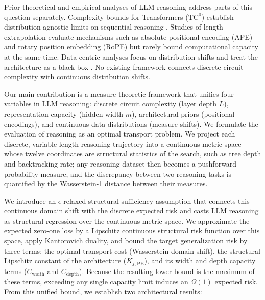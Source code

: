 \documentclass{article}
\begin{document}
Prior theoretical and empirical analyses of LLM reasoning address parts of this question separately. Complexity bounds for Transformers ($\text{TC}^0$) establish distribution-agnostic limits on sequential reasoning \citep{Hahn_2020, merrill2023parallelismtradeofflimitationslogprecision, feng2023revealingmysterychainthought}. Studies of length extrapolation evaluate mechanisms such as absolute positional encoding (APE) and rotary position embedding (RoPE) \citep{kazemnejad2023impactpositionalencodinglength, ruoss2023randomizedpositionalencodingsboost} but rarely bound computational capacity at the same time. Data-centric analyses focus on distribution shifts and treat the architecture as a black box \citep{zhao2026chainofthoughtreasoningllmsmirage, prystawski2023thinkstepstepreasoning}. No existing framework connects discrete circuit complexity with continuous distribution shifts.

Our main contribution is a measure-theoretic framework that unifies four variables in LLM reasoning: discrete circuit complexity (layer depth $L$), representation capacity (hidden width $m$), architectural priors (positional encodings), and continuous data distributions (measure shifts). We formulate the evaluation of reasoning as an optimal transport problem. We project each discrete, variable-length reasoning trajectory into a continuous metric space whose twelve coordinates are structural statistics of the search, such as tree depth and backtracking rate; any reasoning dataset then becomes a pushforward probability measure, and the discrepancy between two reasoning tasks is quantified by the Wasserstein-1 distance between their measures. 

We introduce an $\epsilon$-relaxed structural sufficiency assumption that connects this continuous domain shift with the discrete expected risk and casts LLM reasoning as structural regression over the continuous metric space. We approximate the expected zero-one loss by a Lipschitz continuous structural risk function over this space, apply Kantorovich duality, and bound the target generalization risk by three terms: the optimal transport cost (Wasserstein domain shift), the structural Lipschitz constant of the architecture ($K_{f,\mathrm{PE}}$), and its width and depth capacity terms ($C_{\mathrm{width}}$ and $C_{\mathrm{depth}}$). Because the resulting lower bound is the maximum of these terms, exceeding any single capacity limit induces an $\Omega(1)$ expected risk. From this unified bound, we establish two architectural results:
\end{document}
